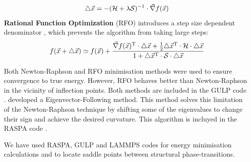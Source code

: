 \begin{equation}
\triangle\vec{x} = -(\mathcal{H}+\lambda\mathcal{S})^{-1}\cdot\vec{\nabla}f(\vec{x})
\end{equation} \textbf{Rational Function Optimization} (RFO) introduces a step size dependent denominator \cite{Byrd2000}, which prevents the algorithm from taking large steps:
\begin{equation}
f(\vec{x}+\triangle\vec{x}) \simeq f(\vec{x})+\frac{\vec{\nabla}f(\vec{x})^{\text{T}}\cdot\triangle\vec{x} + \frac{1}{2}\triangle\vec{x}^\text{T}\cdot\mathcal{H}\cdot\triangle\vec{x}}{1+\triangle\vec{x}^\text{T}\cdot\mathcal{S}\cdot\triangle\vec{x}}
\end{equation} 

Both Newton-Raphson and RFO minimisation methods were used to ensure convergence to true energy. However, RFO behaves better than Newton-Raphson in the vicinity of inflection points. Both methods are included in the GULP code \cite{GULP}.
\citet{Baker,Banerjee1985} developed a Eigenvector-Following method. This method solves this limitation of the Newton-Raphson technique by shifting some of the eigenvalues to change their sign and achieve the desired curvature.
This algorithm is incluyed in the RASPA code \cite{Dubbeldam2009b}.

We have used RASPA, GULP and LAMMPS codes \cite{RASPA_code,GULP,lammps_1995} for energy minimisation calculations and to locate saddle points between structural phase-transitions.

